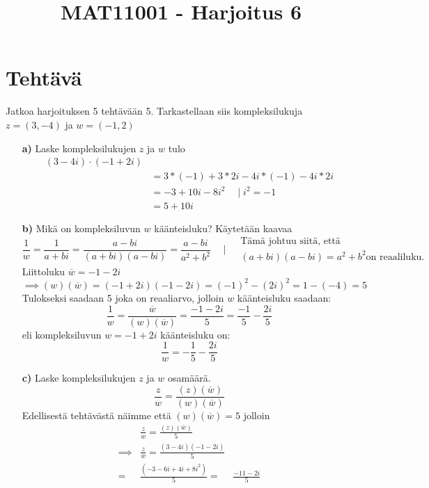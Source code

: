 \documentclass{article}
\newcounter{tehtava}
\begin{document}
    \thispagestyle{plain}
	\title{MAT11001 - Harjoitus 6}
	\date{}
	\maketitle
	
	
	\section*{Tehtävä \thetehtava}
    Jatkoa harjoituksen 5 tehtävään 5. Tarkastellaan siis kompleksilukuja $z = (3, -4)$ ja $w =(-1, 2)$
    \begin{itemize}
        \item[\textbf{a)}] Laske kompleksilukujen $z$ ja $w$ tulo
        \[
        \begin{aligned}    
            (3-4i) \cdot (-1+2i)& \\
            &= 3*(-1) + 3*2i -4i*(-1) -4i*2i \\
            &= -3 + 10i -8i^2 \quad \mid i^2 = -1 \\
            &= 5 + 10i
        \end{aligned}
        \]
        \item[\textbf{b)}] Mikä on kompleksiluvun $w$ käänteisluku? \newline
        Käytetään kaavaa
        \[
            \frac{1}{w} = \frac{1}{a + bi} = \frac{a - bi}{(a + bi)(a - bi)} = \frac{a - bi}{a^2 + b^2}
                \quad \mid
                \begin{aligned}
                &\text{Tämä johtuu siitä, että } \\ &(a + bi)(a - bi) = a^2 + b^2
                \text{on reaaliluku.}
                \end{aligned}
        \]
        Liittoluku $\overline{w} = -1 - 2i$\newline
        $\implies (w)(\overline{w}) = (-1 + 2i)(-1 - 2i) = (-1)^2 - (2i)^2 = 1 - (-4) = 5$\newline
        Tulokseksi saadaan 5 joka on reaaliarvo, jolloin $w$ käänteisluku saadaan:\newline
        \[
        \frac{1}{w} = \frac{\overline{w}}{(w)(\overline{w})} = \frac{-1 - 2i}{5} = \frac{-1}{5} - \frac{2i}{5}
        \]
        eli kompleksiluvun $w = -1 + 2i$ käänteisluku on:
        \[
            \frac{1}{w} = -\frac{1}{5} - \frac{2i}{5}
        \]
\pagebreak
        \item[\textbf{c)}] Laske kompleksilukujen $z$ ja $w$ osamäärä.\newline
        \[
            \frac{z}{w} = \frac{(z)(\overline{w})}{(w)(\overline{w})}
        \]
        Edellisestä tehtävästä näimme että $(w)(\overline{w}) = 5$ jolloin
        \[
        \begin{aligned}
            & \frac{z}{w} = \frac{(z)(\overline{w})}{5} \\
            \implies & \frac{z}{w} = \frac{(3-4i)(-1-2i)}{5} \\
            = & \frac{(-3 -6i +4i + 8i^2)}{5}
            = & \frac{-11 -2i}{5}
        \end{aligned}
        \]



\end{itemize}
\end{document}
